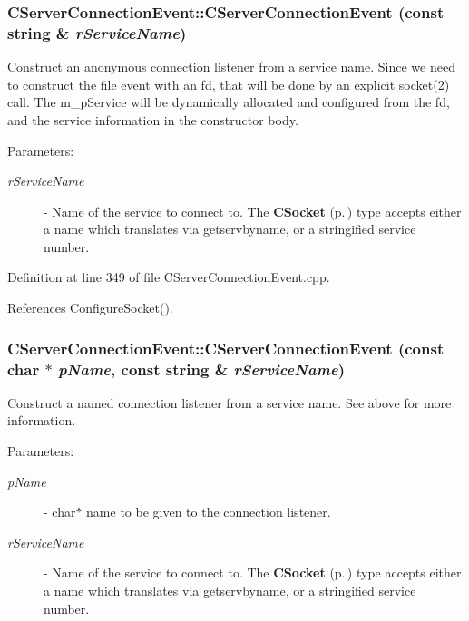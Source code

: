 \subsubsection{\setlength{\rightskip}{0pt plus 5cm}CServer\-Connection\-Event::CServer\-Connection\-Event (const string \& {\em r\-Service\-Name})}\label{classCServerConnectionEvent_a3}


Construct an anonymous connection listener from a service name. Since we need to construct the file event with an fd, that will be done by an explicit socket(2) call. The m\_\-p\-Service will be dynamically allocated and configured from the fd, and the service information in the constructor body.\begin{Desc}
\item[Parameters: ]\par
\begin{description}
\item[{\em 
r\-Service\-Name}]- Name of the service to connect to. The {\bf CSocket} {\rm (p.\,\pageref{classCSocket})} type accepts either a name which translates via getservbyname, or a stringified service number. \end{description}
\end{Desc}


Definition at line 349 of file CServer\-Connection\-Event.cpp.

References Configure\-Socket().
\subsubsection{\setlength{\rightskip}{0pt plus 5cm}CServer\-Connection\-Event::CServer\-Connection\-Event (const char $\ast$ {\em p\-Name}, const string \& {\em r\-Service\-Name})}\label{classCServerConnectionEvent_a4}


Construct a named connection listener from a service name. See above for more information. \begin{Desc}
\item[Parameters: ]\par
\begin{description}
\item[{\em 
p\-Name}]- char$\ast$ name to be given to the connection listener. \item[{\em 
r\-Service\-Name}]- Name of the service to connect to. The {\bf CSocket} {\rm (p.\,\pageref{classCSocket})} type accepts either a name which translates via getservbyname, or a stringified service number. \end{description}
\end{Desc}


